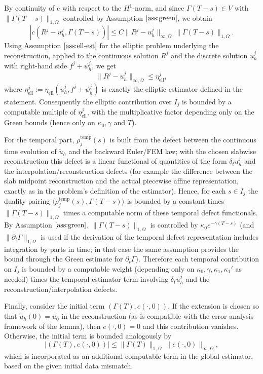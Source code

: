 \documentclass{article}
\begin{document}
By continuity of c with respect to the \(H^1\)-norm, and since \(\Gamma(T-s)\in V\) with \(\|\Gamma(T-s)\|_{1,\Omega}\) controlled by Assumption \(\ref{ass:green}\), we obtain
\[
\left|c(R^j-u_h^j,\Gamma(T-s))\right|\le C\|R^j-u_h^j\|_{\infty,\Omega}\,\|\Gamma(T-s)\|_{1,\Omega}.
\]
Using Assumption \(\ref{ass:ell-est}\) for the elliptic problem underlying the reconstruction, applied to the continuous solution \(R^j\) and the discrete solution \(u_h^j\) with right-hand side \(f^j+\psi_h^j\), we get
\[
\|R^j-u_h^j\|_{\infty,\Omega}\le \eta_\mathrm{ell}^j,
\]
where \(\eta_\mathrm{ell}^j:=\eta_\mathrm{ell}(u_h^j,f^j+\psi_h^j)\) is exactly the elliptic estimator defined in the statement.
Consequently the elliptic contribution over \(I_j\) is bounded by a computable multiple of \(\eta_\mathrm{ell}^j\), with the multiplicative factor depending only on the Green bounds (hence only on \(\kappa_0,\gamma\) and \(T\)).

For the temporal part, \(\rho_j^{\mathrm{temp}}(s)\) is built from the defect between the continuous time evolution of \(\tilde u_h\) and the backward Euler/FEM law; with the chosen slabwise reconstruction this defect is a linear functional of quantities of the form \(\delta_t u_h^j\) and the interpolation/reconstruction defects (for example the difference between the slab midpoint reconstruction and the actual piecewise affine representation, exactly as in the problem’s definition of the estimator). Hence, for each \(s\in I_j\) the duality pairing \(\langle \rho_j^{\mathrm{temp}}(s),\Gamma(T-s)\rangle\) is bounded by a constant times \(\|\Gamma(T-s)\|_{1,\Omega}\) times a computable norm of these temporal defect functionals. By Assumption \(\ref{ass:green}\), \(\|\Gamma(T-s)\|_{1,\Omega}\) is controlled by \(\kappa_0 e^{-\gamma(T-s)}\) (and \(\|\partial_t\Gamma\|_{1,\Omega}\) is used if the derivation of the temporal defect representation includes integration by parts in time; in that case the same assumption provides the bound through the Green estimate for \(\partial_t\Gamma\)). Therefore each temporal contribution on \(I_j\) is bounded by a computable weight (depending only on \(\kappa_0,\gamma,\kappa_1,\kappa_1'\) as needed) times the temporal estimator term involving \(\delta_t u_h^j\) and the reconstruction/interpolation defects.

Finally, consider the initial term \((\Gamma(T),e(\cdot,0))\). If the extension is chosen so that \(\tilde u_h(0)=u_0\) in the reconstruction (as is compatible with the error analysis framework of the lemma), then \(e(\cdot,0)=0\) and this contribution vanishes. Otherwise, the initial term is bounded analogously by
\[
\big|(\Gamma(T),e(\cdot,0))\big|\le \|\Gamma(T)\|_{1,\Omega}\,\|e(\cdot,0)\|_{\infty,\Omega},
\]
which is incorporated as an additional computable term in the global estimator, based on the given initial data mismatch.
\end{document}
